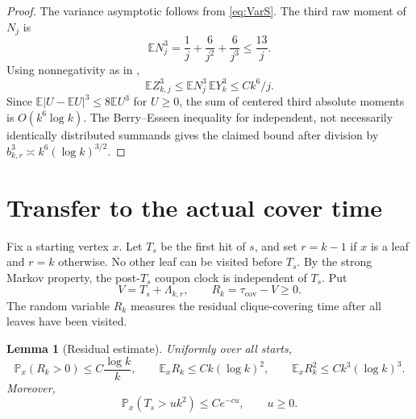 \documentclass[11pt]{amsart}
\newtheorem{lemma}[theorem]{Lemma}
\theoremstyle{remark}
\numberwithin{equation}{section}
\newcommand{\E}{\mathbb{E}}
\newcommand{\Prob}{\mathbb{P}}
\newcommand{\taucov}{\tau_{\mathrm{cov}}}
\begin{document}
\begin{proof}
The variance asymptotic follows from \eqref{eq:VarS}. The third raw moment of $N_j$ is
\[
\E N_j^3=\frac1j+\frac6{j^2}+\frac6{j^3}\le\frac{13}{j}.
\]
Using nonnegativity as in ,
\[
\E Z_{k,j}^3\le\E N_j^3\,\E Y_k^3\le Ck^6/j.
\]
Since $\E|U-\E U|^3\le 8\E U^3$ for $U\ge 0$, the sum of centered third absolute moments is $O(k^6\log k)$. The Berry--Esseen inequality for independent, not necessarily identically distributed summands \cite{Petrov75} gives the claimed bound after division by $b_{k,r}^3\asymp k^6(\log k)^{3/2}$.
\end{proof}

\section{Transfer to the actual cover time}\label{sec:transfer}

Fix a starting vertex $x$. Let $T_s$ be the first hit of $s$, and set $r=k-1$ if $x$ is a leaf and $r=k$ otherwise. No other leaf can be visited before $T_s$. By the strong Markov property, the post-$T_s$ coupon clock is independent of $T_s$. Put
\[
V=T_s+\Lambda_{k,r},\qquad R_k=\taucov-V\ge 0.
\]
The random variable $R_k$ measures the residual clique-covering time after all leaves have been visited.

\begin{lemma}[Residual estimate]\label{lem:residual}
Uniformly over all starts,
\begin{equation}\label{eq:residual}
\Prob_x(R_k>0)\le C\frac{\log k}{k},\qquad \E_xR_k\le Ck(\log k)^2,\qquad \E_xR_k^2\le Ck^3(\log k)^3.
\end{equation}
Moreover,
\begin{equation}\label{eq:Tstail}
\Prob_x(T_s>uk^2)\le Ce^{-cu},\qquad u\ge 0.
\end{equation}
\end{lemma}
\end{document}
